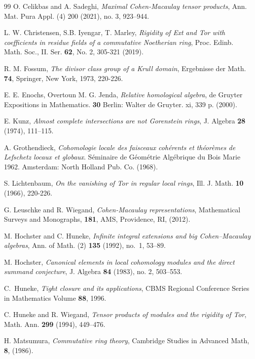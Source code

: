 \documentclass[11pt,a4paper]{amsart}
\numberwithin{equation}{section}
\theoremstyle{definition}
\theoremstyle{remark}
\begin{document}
\begin{thebibliography}{99}
 O. Celikbas and A. Sadeghi, \emph{Maximal Cohen-Macaulay tensor products}, Ann. Mat. Pura Appl. (4) 200 (2021), no. 3, 923–944.

 L. W. Christensen, S.B. Iyengar, T. Marley,  
\emph{Rigidity of Ext and Tor with coefficients in residue fields of a commutative Noetherian ring},
		Proc. Edinb. Math. Soc., II. Ser. {\bf 62}, No. 2, 305-321 (2019).
		
 R. M. Fossum, \emph{The divisor class group of a Krull domain}, Ergebnisse der Math. \textbf{74}, Springer, New York, 1973, 220-226.
		
 E. E. Enochs, Overtoun M. G. Jenda, 
\emph{Relative homological algebra}, 
		de Gruyter Expositions in Mathematics. \textbf{30} Berlin: Walter de Gruyter. xi, 339 p. (2000).
		

				
		
E. Kunz, \emph{Almost complete intersections are not Gorenstein rings}, J. Algebra {\bf{28}} (1974), 111–115.
		
		
A. Grothendieck,
\emph{Cohomologie locale des faisceaux coh\'{e}rents et th\'{e}or\`{e}mes de Lefschetz locaux et globaux}.
S\'{e}minaire de G\'{e}om\'{e}trie Alg\'{e}brique du Bois Marie  1962. Amsterdam: North Holland Pub. Co. (1968).

S. Lichtenbaum, \emph{On the vanishing of Tor in regular local rings}, Ill. J. Math.  {\bf10} (1966),
		220-226.
		
		
 G. Leuschke and R. Wiegand, \emph{Cohen-Macaulay representations}, Mathematical Surveys and Monographs, {\bf 181}, AMS, Providence, RI, (2012).
		
M. Hochster and C. Huneke,
\emph{Infinite integral extensions and big Cohen--Macaulay algebras},
Ann. of Math. (2) \textbf{135} (1992), no.~1, 53--89.
		
 M. Hochster, 	\emph{Canonical elements in local cohomology modules and the direct summand conjecture}, J. Algebra {\bf84} (1983), no. 2, 503–553.
	
   {C.~Huneke}, \emph{Tight closure and its applications}, CBMS Regional Conference Series in Mathematics
		Volume {\bf88}, 1996.

 C. Huneke and R. Wiegand, \emph{Tensor products of modules and the rigidity of Tor}, Math. Ann. {\bf 299} (1994), 449--476.

		
 H. Matsumura, \emph{Commutative ring theory}, Cambridge Studies in Advanced Math, \textbf{8}, (1986).
		

\end{thebibliography}
\end{document}
